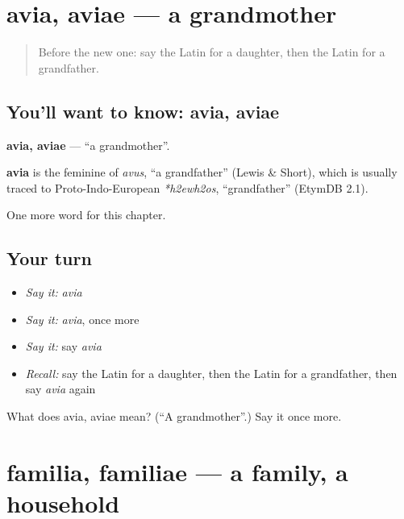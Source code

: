 \section[avia, aviae]{avia, aviae — a grandmother}

\label{lesson:LA-C70-avia}



\begin{quote}
Before the new one: say the Latin for a daughter, then the Latin for a grandfather.
\end{quote}

\subsection*{You'll want to know: avia, aviae}
\textbf{avia, aviae} — \textquotedblleft{}a grandmother\textquotedblright{}.

\begin{cousinweb}
\textbf{avia} is the feminine of \emph{avus}, \textquotedblleft{}a grandfather\textquotedblright{} (Lewis \& Short), which is usually traced to Proto-Indo-European \emph{*h2ewh2os}, \textquotedblleft{}grandfather\textquotedblright{} (EtymDB 2.1).
\end{cousinweb}

\begin{grammarlens}[title={What you've built}]
One more word for this chapter.
\end{grammarlens}

\subsection*{Your turn}
\begin{itemize}
\raggedright
  \item \emph{Say it:} \emph{avia}
  \item \emph{Say it:} \emph{avia}, once more
  \item \emph{Say it:} say \emph{avia}
  \item \emph{Recall:} say the Latin for a daughter, then the Latin for a grandfather, then say \emph{avia} again
\end{itemize}

\begin{tcolorbox}[breakable,colback=teal!4,colframe=teal!35!black,title={Before you move on}]
What does avia, aviae mean? (\textquotedblleft{}A grandmother\textquotedblright{}.) Say it once more.
\end{tcolorbox}
\section[familia, familiae]{familia, familiae — a family, a household}

